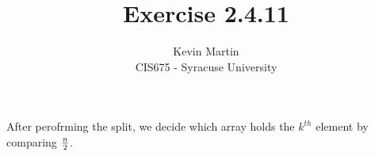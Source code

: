 \documentclass{article}
\author{Kevin Martin\\ CIS675 - Syracuse University}
\title{Exercise 2.4.11}
\begin{document}
\maketitle
After perofrming the split, we decide which array holds the \(k^{th}\) element by comparing \(n\over 2\).
\end{document}
